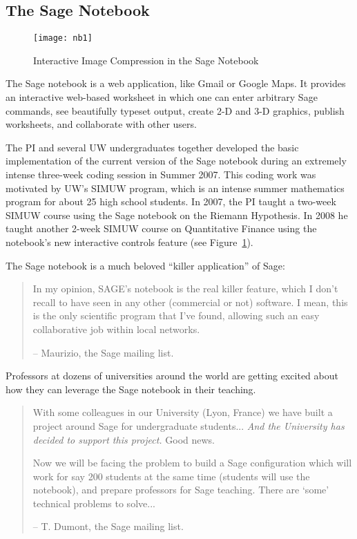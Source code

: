 \documentclass[11pt]{article}
\begin{document}
\subsection{The Sage Notebook}
\begin{figure}
\begin{center}
\texttt{[image: nb1]}
\caption{Interactive Image Compression in the Sage Notebook\label{fig:interact}}
\end{center}
\end{figure}
The Sage notebook is a web application, like Gmail or Google Maps.
It provides an interactive web-based worksheet in which one can enter
arbitrary Sage commands, see beautifully typeset output, create 2-D
and 3-D graphics, publish worksheets, and collaborate with other
users.

The PI and several UW undergraduates together developed the basic
implementation of the current version of the Sage notebook during an
extremely intense three-week coding session in Summer 2007.  This coding
work was motivated by UW's SIMUW program, which is an intense summer
mathematics program for about 25 high school students.  In 2007, the
PI taught a two-week SIMUW course using the Sage notebook on the Riemann
Hypothesis.  In 2008 he taught another 2-week SIMUW course on
Quantitative Finance using the notebook's new interactive controls
feature (see Figure~\ref{fig:interact}).

The Sage notebook is a much beloved ``killer application'' of Sage:
\begin{quote}
  In my opinion, SAGE's notebook is the real killer feature, which I
  don't recall to have seen in any other (commercial or not)
  software. I mean, this is the only scientific program that I've
  found, allowing such an easy collaborative job within local
  networks.

 -- Maurizio, the Sage mailing list.
\end{quote}

Professors at dozens of universities around the world are getting
excited about how they can leverage the Sage notebook in their
teaching.
\begin{quote}
With some colleagues in our University (Lyon, France) we have built a
project around Sage for undergraduate students... {\em And the University has
decided to support this project.} Good news.

Now we will be facing the problem to build a Sage configuration which
will work for say 200 students at the same time (students will use the
notebook), and prepare professors for Sage teaching. There are `some'
technical problems to solve...
 
-- T. Dumont, the Sage mailing list.
\end{quote}
\end{document}
